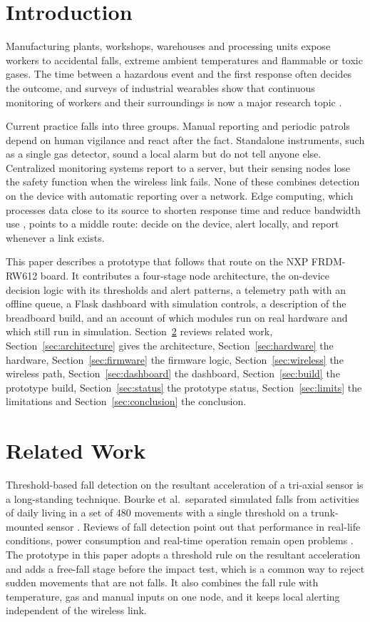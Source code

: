 \documentclass[conference]{IEEEtran}
\begin{document}
\section{Introduction}
Manufacturing plants, workshops, warehouses and processing units expose workers to accidental falls, extreme ambient temperatures and flammable or toxic gases. The time between a hazardous event and the first response often decides the outcome, and surveys of industrial wearables show that continuous monitoring of workers and their surroundings is now a major research topic \cite{svertoka2021}.

Current practice falls into three groups. Manual reporting and periodic patrols depend on human vigilance and react after the fact. Standalone instruments, such as a single gas detector, sound a local alarm but do not tell anyone else. Centralized monitoring systems report to a server, but their sensing nodes lose the safety function when the wireless link fails. None of these combines detection on the device with automatic reporting over a network. Edge computing, which processes data close to its source to shorten response time and reduce bandwidth use \cite{shi2016}, points to a middle route: decide on the device, alert locally, and report whenever a link exists.

This paper describes a prototype that follows that route on the NXP FRDM-RW612 board. It contributes a four-stage node architecture, the on-device decision logic with its thresholds and alert patterns, a telemetry path with an offline queue, a Flask dashboard with simulation controls, a description of the breadboard build, and an account of which modules run on real hardware and which still run in simulation. Section~\ref{sec:related} reviews related work, Section~\ref{sec:architecture} gives the architecture, Section~\ref{sec:hardware} the hardware, Section~\ref{sec:firmware} the firmware logic, Section~\ref{sec:wireless} the wireless path, Section~\ref{sec:dashboard} the dashboard, Section~\ref{sec:build} the prototype build, Section~\ref{sec:status} the prototype status, Section~\ref{sec:limits} the limitations and Section~\ref{sec:conclusion} the conclusion.

\section{Related Work}
\label{sec:related}
Threshold-based fall detection on the resultant acceleration of a tri-axial sensor is a long-standing technique. Bourke et al.\ separated simulated falls from activities of daily living in a set of 480 movements with a single threshold on a trunk-mounted sensor \cite{bourke2007}. Reviews of fall detection point out that performance in real-life conditions, power consumption and real-time operation remain open problems \cite{igual2013}. The prototype in this paper adopts a threshold rule on the resultant acceleration and adds a free-fall stage before the impact test, which is a common way to reject sudden movements that are not falls. It also combines the fall rule with temperature, gas and manual inputs on one node, and it keeps local alerting independent of the wireless link.
\end{document}
